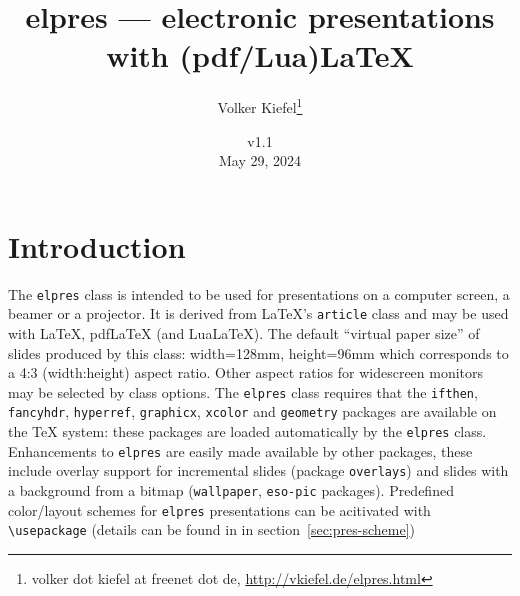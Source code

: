 \documentclass[11pt,a4paper]{article}
\title{\textsf{elpres} --- electronic presentations \\ with (pdf/Lua)\LaTeX}
\author{Volker Kiefel\thanks{volker dot kiefel at freenet dot de, 
       \url{http://vkiefel.de/elpres.html}}}
\date{v1.1 \\[1.8ex]
  May 29, 2024%
}
\begin{document}
\maketitle
\thispagestyle{empty}

\tableofcontents




\section{Introduction}

\label{sec:Introduction}

The \texttt{elpres} class is intended to be used for
presentations on a computer screen, a
beamer or a projector. It is derived from \LaTeX's \texttt{article} class and
may be used with \LaTeX{}, pdf\LaTeX{} (and Lua\LaTeX ).
The default ``virtual paper size'' of slides produced by this class:
width=128mm, height=96mm which corresponds to a 4:3 (width:height) aspect
ratio.
%
%
Other aspect ratios for widescreen monitors may be selected by class
options.
The \texttt{elpres} class requires that the \texttt{ifthen},
\texttt{fancyhdr},
\texttt{hyperref},
\texttt{graphicx},
\texttt{xcolor}
and \texttt{geometry} packages are available on the \TeX{} system: these
packages are loaded automatically by the \texttt{elpres} class.
Enhancements to \texttt{elpres} are easily made available by other packages,
these include overlay support for incremental slides (package
\texttt{overlays})  and slides
with a background from a bitmap (\texttt{wallpaper}, \texttt{eso-pic}
packages). Predefined color/layout schemes for \texttt{elpres} presentations
can be acitivated with
\verb+\usepackage+ (details can be found in
in section~\ref{sec:pres-scheme})
\end{document}
